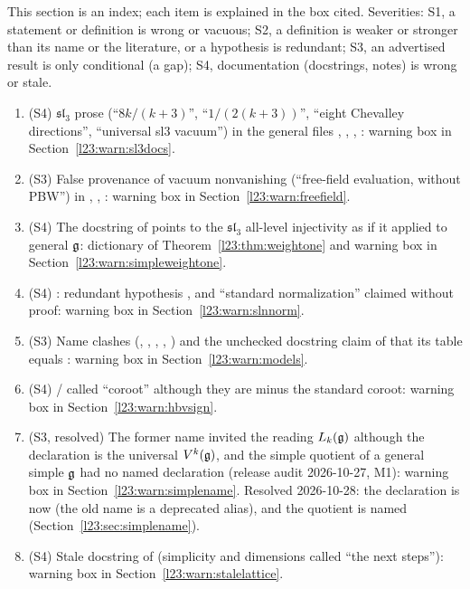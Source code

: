 This section is an index; each item is explained in the box cited. Severities: S1, a statement or definition is wrong or vacuous; S2, a definition is weaker or stronger than its name or the literature, or a hypothesis is redundant; S3, an advertised result is only conditional (a gap); S4, documentation (docstrings, notes) is wrong or stale.
\begin{enumerate}
\item (S4) $\mathfrak{sl}_3$ prose (``$8k/(k+3)$'', ``$1/(2(k+3))$'', ``eight Chevalley directions'', ``universal sl3 vacuum'') in the
  general files , , , : warning box in
  Section~\ref{l23:warn:sl3docs}.
\item (S3) False provenance of vacuum nonvanishing (``free-field evaluation, without PBW'') in ,
  , : warning box in Section~\ref{l23:warn:freefield}.
\item (S4) The docstring of  points to the $\mathfrak{sl}_3$ all-level injectivity as if
  it applied to general $\mathfrak g$: dictionary of Theorem~\ref{l23:thm:weightone} and warning box in Section~\ref{l23:warn:simpleweightone}.
\item (S4) : redundant hypothesis , and ``standard normalization'' claimed without proof: warning box in
  Section~\ref{l23:warn:slnnorm}.
\item (S3) Name clashes (, , , , ) and the unchecked docstring
  claim of  that its table equals : warning box in Section~\ref{l23:warn:models}.
\item (S4) / called ``coroot'' although they are minus the standard coroot: warning box in
  Section~\ref{l23:warn:hbvsign}.
\item (S3, resolved) The former name  invited the reading $L_k(\mathfrak g)$ although the declaration
  is the universal $V^k(\mathfrak g)$, and the simple quotient of a general simple $\mathfrak g$ had no named declaration (release audit 2026-10-27,
  M1): warning box in Section~\ref{l23:warn:simplename}. Resolved 2026-10-28: the declaration is now  (the old
  name is a deprecated alias), and the quotient is named  (Section~\ref{l23:sec:simplename}).
\item (S4) Stale docstring of  (simplicity and dimensions called ``the next steps''): warning box in
  Section~\ref{l23:warn:stalelattice}.
\end{enumerate}

